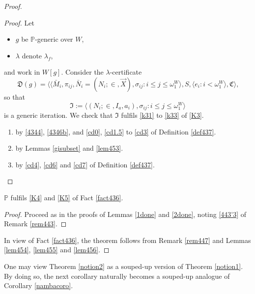 \documentclass[12pt]{article}
\numberwithin{equation}{section}
\begin{document}
\begin{proof}
\begin{proof}
Let 
\begin{itemize}
    \item $g$ be $\mathbb{P}$-generic over $W$,
    \item $\lambda$ denote $\lambda_f$, 
\end{itemize} 
and work in $W[g]$. Consider the $\lambda$-certificate
\begin{equation*}
    \mathfrak{D}(g) = \langle \langle \bar{M}_i, \pi_{ij},  \bar{N}_i = (N_i; \in, \Vec{X}), \sigma_{ij} : i \leq j \leq \omega_1^{W} \rangle, S, \langle e_i : i < \omega_1^W \rangle, \mathfrak{C} \rangle \text{,}
\end{equation*}
so that 
\begin{equation*}
    \mathfrak{I} := \langle (N_i; \in, I_a, a_i), \sigma_{ij} : i \leq j \leq \omega_1^{W} \rangle
\end{equation*}
is a generic iteration. We check that $\mathfrak{I}$ fulfils \ref{k31} to \ref{k33} of \ref{K3}.
\begin{enumerate}[label=That \ref{k3\arabic*} holds:, leftmargin=100pt]
    \item by \ref{4344}, \ref{4346b}, and \ref{cd0}, \ref{cd1.5} to \ref{cd3} of Definition \ref{def437}.
    \item by Lemmas \ref{gisubset} and \ref{lem453}.
    \item by \ref{cd4}, \ref{cd6} and \ref{cd7} of Definition \ref{def437}. \qedhere
\end{enumerate}
\end{proof}

\begin{lem}\label{lem456}
$\mathbb{P}$ fulfils \ref{K4} and \ref{K5} of Fact \ref{fact436}.
\end{lem}

\begin{proof}
Proceed as in the proofs of Lemmas \ref{1done} and \ref{2done}, noting \ref{443'3} of Remark \ref{rem443}.
\end{proof}

In view of Fact \ref{fact436}, the theorem follows from Remark \ref{rem447} and Lemmas \ref{lem454}, \ref{lem455} and \ref{lem456}.
\end{proof}

One may view Theorem \ref{notion2} as a souped-up version of Theorem \ref{notion1}. By doing so, the next corollary naturally becomes a souped-up analogue of Corollary \ref{nambacoro}. 
\end{document}
